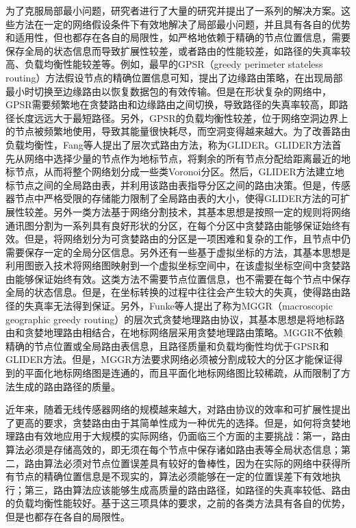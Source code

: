 为了克服局部最小问题，研究者进行了大量的研究并提出了一系列的解决方案。这些方法在一定的网络假设条件下有效地解决了局部最小问题，并且具有各自的优势和适用性，但也都存在各自的局限性，如严格地依赖于精确的节点位置信息，需要保存全局的状态信息而导致扩展性较差，或者路由的性能较差，如路径的失真率较高、负载均衡性能较差等。例如，最早的GPSR（greedy perimeter stateless routing）方法假设节点的精确位置信息可知，提出了边缘路由策略，在出现局部最小时切换至边缘路由以恢复数据包的有效传输。但是在形状复杂的网络中，GPSR需要频繁地在贪婪路由和边缘路由之间切换，导致路径的失真率较高，即路径长度远远大于最短路径。另外，GPSR的负载均衡性较差，位于网络空洞边界上的节点被频繁地使用，导致其能量很快耗尽，而空洞变得越来越大。为了改善路由负载均衡性，Fang等人提出了层次式路由方法，称为GLIDER。GLIDER方法首先从网络中选择少量的节点作为地标节点，将剩余的所有节点分配给距离最近的地标节点，从而将整个网络划分成一些类Voronoi分区。然后，GLIDER方法建立地标节点之间的全局路由表，并利用该路由表指导分区之间的路由决策。但是，传感器节点中严格受限的存储能力限制了全局路由表的大小，使得GLIDER方法的可扩展性较差。另外一类方法基于网络分割技术，其基本思想是按照一定的规则将网络通讯图分割为一系列具有良好形状的分区，在每个分区中贪婪路由能够保证始终有效。但是，将网络划分为可贪婪路由的分区是一项困难和复杂的工作，且节点中仍需要保存一定的全局分区信息。另外还有一些基于虚拟坐标的方法，其基本思想是利用图嵌入技术将网络图映射到一个虚拟坐标空间中，在该虚拟坐标空间中贪婪路由能够保证始终有效。这类方法不需要节点位置信息，也不需要在每个节点中保存全局的状态信息。但是，在坐标转换的过程中往往会产生较大的失真，使得路由路径的失真率无法得到保证。另外，Funke等人提出了称为MGGR（macroscopic geographic greedy routing）的层次式贪婪地理路由协议，其基本思想是将地标路由和贪婪地理路由相结合，在地标网络层采用贪婪地理路由策略。MGGR不依赖精确的节点位置或全局路由表信息，且路径质量和负载均衡性均优于GPSR和GLIDER方法。但是，MGGR方法要求网络必须被分割成较大的分区才能保证得到的平面化地标网络图是连通的，而且平面化地标网络图比较稀疏，从而限制了方法生成的路由路径的质量。

近年来，随着无线传感器网络的规模越来越大，对路由协议的效率和可扩展性提出了更高的要求，贪婪路由由于其简单性成为一种优先的选择。但是，如何将贪婪地理路由有效地应用于大规模的实际网络，仍面临三个方面的主要挑战：第一，路由算法必须是存储高效的，即无须在每个节点中保存诸如路由表等全局状态信息；第二，路由算法必须对节点位置误差具有较好的鲁棒性，因为在实际的网络中获得所有节点的精确位置信息是不现实的，算法必须能够在一定的位置误差下有效地执行；第三，路由算法应该能够生成高质量的路由路径，如路径的失真率较低、路由的负载均衡性能较好。基于这三项具体的要求，之前的各类方法具有各自的优势，但是也都存在各自的局限性。

